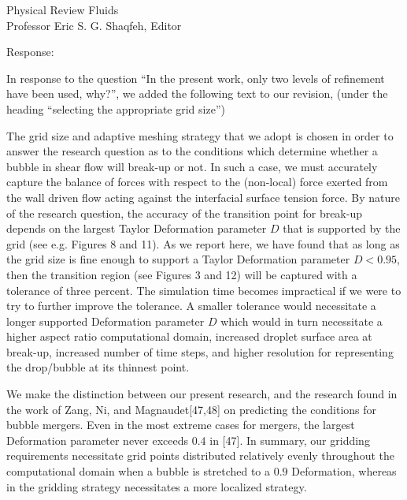 \documentclass{letter}
\begin{document}
\begin{letter}{
Physical Review Fluids\\
Professor Eric S. G. Shaqfeh, Editor\\}
\begin{enumerate}
Response: \\
\par\noindent
In response to the question ``In the present
work, only two levels of refinement have been used, why?'', we added the 
following text to our revision, (under the heading ``selecting the 
appropriate grid size'')
\par\noindent

{ \color{red}
The grid size and adaptive meshing strategy that we adopt is chosen
in order to answer the research question as to the conditions which determine
whether a bubble in shear flow
will break-up or not.  In such a case, we must accurately capture the 
balance of forces with respect to the (non-local) force exerted from the 
wall driven 
flow acting against the interfacial
surface tension force.  By nature of the research question, 
the accuracy of the transition
point for break-up depends on the 
largest Taylor Deformation parameter $D$
that is supported by the grid (see e.g. Figures 8 and 11).  
As we report here, we have found that as
long as the grid size is fine enough to support a Taylor Deformation parameter
$D<0.95$, then the transition region 
(see Figures 3 and 12) will be captured
with a tolerance of three percent.  The simulation time becomes impractical
if we were to try to further improve the tolerance.  A smaller tolerance
would necessitate a longer supported Deformation
parameter $D$ which would in turn necessitate a higher aspect ratio
computational domain, increased droplet surface area at break-up,
increased number of time steps, and higher resolution for representing the
drop/bubble at its thinnest point.

We make the distinction between our present research, and the research found
in the work of Zang, Ni, 
and Magnaudet[47,48] on predicting the
conditions for bubble mergers.  Even in the most extreme cases for
mergers, the largest Deformation parameter never exceeds
$0.4$ in [47].  In summary, our gridding requirements 
necessitate grid points distributed relatively evenly throughout the 
computational domain when a bubble is stretched to a $0.9$ Deformation,
whereas in \cite{zhang2021three} the gridding strategy necessitates 
a more localized strategy.

}


\end{enumerate}
\end{letter}
\end{document}
